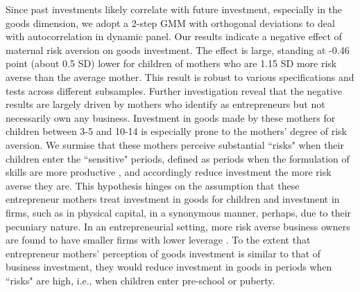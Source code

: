 \documentclass[emulatestandardclasses, 10pt, abstract = true]{scrartcl}
\begin{document}
Since past investments likely correlate with future investment, especially in the goods dimension, we adopt a 2-step GMM \citep{arellano1991some, blundell1998initial} with orthogonal deviations \citep{arellano1995another} to deal with autocorrelation in dynamic panel. Our results indicate a negative effect of maternal risk aversion on goods investment. The effect is large, standing at -0.46 point (about 0.5 SD) lower for children of mothers who are 1.15 SD more risk averse than the average mother. This result is robust to various specifications and tests across different subsamples. Further investigation reveal that the negative results are largely driven by mothers who identify as entrepreneurs but not necessarily own any business. Investment in goods made by these mothers for children between 3-5 and 10-14 is especially prone to the mothers' degree of risk aversion. We surmise that these mothers perceive substantial ``risks" when their children enter the ``sensitive" periods, defined as periods when the formulation of skills are more productive \citep{knudsen2006economic, cunha2007technology}, and accordingly reduce investment the more risk averse they are. This hypothesis hinges on the assumption that these entrepreneur mothers treat investment in goods for children and investment in firms, such as in physical capital, in a synonymous manner, perhaps, due to their pecuniary nature. In an entrepreneurial setting, more risk averse business owners are found to have smaller firms with lower leverage \citep{herranz2015entrepreneurs}. To the extent that entrepreneur mothers' perception of goods investment is similar to that of business investment, they would reduce investment in goods in periods when ``risks" are high, i.e., when children enter pre-school or puberty.  
\end{document}
